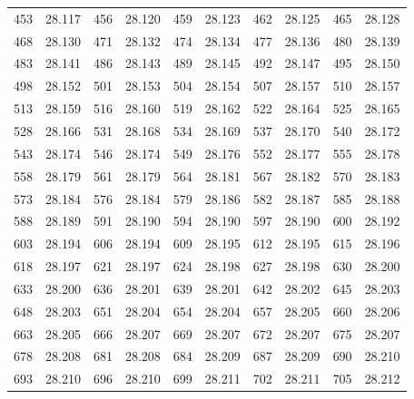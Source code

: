 \documentclass[12pt]{ctexart}
\numberwithin{equation}{section}
\begin{document}
\begin{longtable}{cc|cc|cc|cc|cc}
    453      & 28.117   & 456      & 28.120   & 459      & 28.123   & 462      & 28.125   & 465      & 28.128   \\
    468      & 28.130   & 471      & 28.132   & 474      & 28.134   & 477      & 28.136   & 480      & 28.139   \\
    483      & 28.141   & 486      & 28.143   & 489      & 28.145   & 492      & 28.147   & 495      & 28.150   \\
    498      & 28.152   & 501      & 28.153   & 504      & 28.154   & 507      & 28.157   & 510      & 28.157   \\
    513      & 28.159   & 516      & 28.160   & 519      & 28.162   & 522      & 28.164   & 525      & 28.165   \\
    528      & 28.166   & 531      & 28.168   & 534      & 28.169   & 537      & 28.170   & 540      & 28.172   \\
    543      & 28.174   & 546      & 28.174   & 549      & 28.176   & 552      & 28.177   & 555      & 28.178   \\
    558      & 28.179   & 561      & 28.179   & 564      & 28.181   & 567      & 28.182   & 570      & 28.183   \\
    573      & 28.184   & 576      & 28.184   & 579      & 28.186   & 582      & 28.187   & 585      & 28.188   \\
    588      & 28.189   & 591      & 28.190   & 594      & 28.190   & 597      & 28.190   & 600      & 28.192   \\
    603      & 28.194   & 606      & 28.194   & 609      & 28.195   & 612      & 28.195   & 615      & 28.196   \\
    618      & 28.197   & 621      & 28.197   & 624      & 28.198   & 627      & 28.198   & 630      & 28.200   \\
    633      & 28.200   & 636      & 28.201   & 639      & 28.201   & 642      & 28.202   & 645      & 28.203   \\
    648      & 28.203   & 651      & 28.204   & 654      & 28.204   & 657      & 28.205   & 660      & 28.206   \\
    663      & 28.205   & 666      & 28.207   & 669      & 28.207   & 672      & 28.207   & 675      & 28.207   \\
    678      & 28.208   & 681      & 28.208   & 684      & 28.209   & 687      & 28.209   & 690      & 28.210   \\
    693      & 28.210   & 696      & 28.210   & 699      & 28.211   & 702      & 28.211   & 705      & 28.212   \\

\end{longtable}
\end{document}
